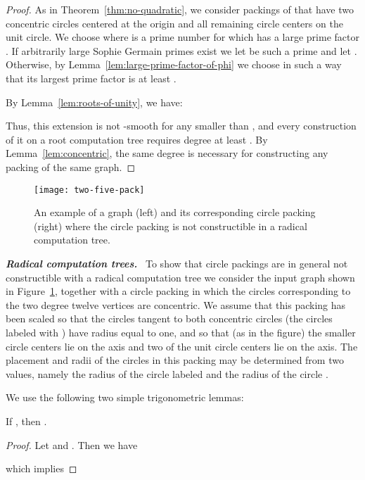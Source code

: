 \documentclass[oribibl,10pt]{llncs}
\newcommand{\Emph}[1]{\smallskip\textbf{\textit{#1}}~}
\begin{document}
\begin{appendix}
\begin{proof}
As in Theorem~\ref{thm:no-quadratic},
we consider packings of  that have two concentric circles centered at the origin and all remaining circle centers on the unit circle. We choose  where  is a prime number for which  has a large prime factor . If arbitrarily large Sophie Germain primes exist we let  be such a prime and let . Otherwise, by Lemma~\ref{lem:large-prime-factor-of-phi} we choose  in such a way that its largest prime factor  is at least .

By Lemma~\ref{lem:roots-of-unity}, we have:

Thus, this extension is not -smooth for any  smaller than , and every construction of it on a root computation tree requires degree at least .
By Lemma~\ref{lem:concentric}, the same degree is necessary for constructing any packing of the same graph.
\end{proof}

\begin{figure}
\centering
\texttt{[image: two-five-pack]}
\caption{An example of a graph (left) and its corresponding circle packing (right) where the circle packing is not constructible in a radical computation tree.}
\label{fig:two-five-graph}
\end{figure}

\Emph{Radical computation trees.} To show that circle packings are in general not constructible with a radical computation tree we consider the input graph shown in Figure~\ref{fig:two-five-graph},  together with a circle packing in which the circles corresponding to the two degree twelve vertices are concentric. We assume that this packing has been scaled so that the circles tangent to both concentric circles (the circles labeled with ) have radius equal to one, and so that (as in the figure) the smaller circle centers lie on the  axis and two of the unit circle centers lie on the  axis. The placement and radii of the circles in this packing may be determined from two values, namely the radius  of the circle labeled  and the radius  of the circle .

We use the following two simple trigonometric lemmas:

\begin{lemma}\label{lem:twin-circles}
If , then .
\end{lemma}

\begin{proof}
Let  and . Then we have

which implies


\end{proof}
\end{appendix}
\end{document}
